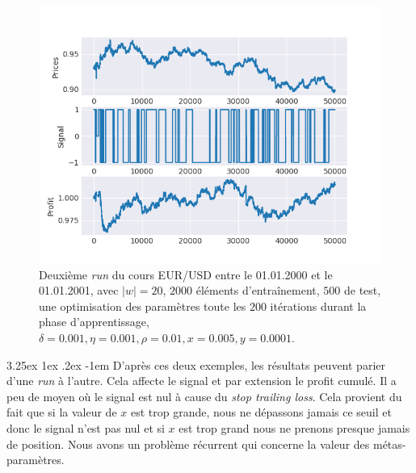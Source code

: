 \documentclass[a4paper, 11pt]{article}
\makeatletter
\renewcommand\paragraph{\@startsection{paragraph}{5}{\z@}%
  {3.25ex \@plus1ex \@minus.2ex}%
  {-1em}%
  {\normalfont\normalsize\bfseries}}
\makeatother
\begin{document}
 \begin{figure}[H]
\centering
\includegraphics[]{images/res/eurusd_2000_2001_2.png}
\caption[Blup]{Deuxième \textit{run} du cours EUR/USD entre le 01.01.2000 et le 01.01.2001, avec $|w| = 20$, $2000$ éléments d'entraînement, $500$ de test,
une optimisation des paramètres toute les $200$ itérations durant la phase d'apprentissage, $\delta = 0.001, \eta=0.001,\rho=0.01, x = 0.005, y=0.0001$.}
\end{figure}

\paragraph{}
D'après ces deux exemples, les résultats peuvent parier d'une \textit{run} à l'autre. Cela affecte le signal et par extension le profit cumulé. Il a peu
de moyen où le signal est nul à cause du \textit{stop trailing loss}. Cela provient du fait que si la valeur de $x$ est trop grande, nous ne dépassons
jamais ce seuil et donc le signal n'est pas nul et si $x$ est trop grand nous ne prenons presque jamais de position. Nous avons un problème récurrent
qui concerne la valeur des métas-paramètres.
\end{document}

